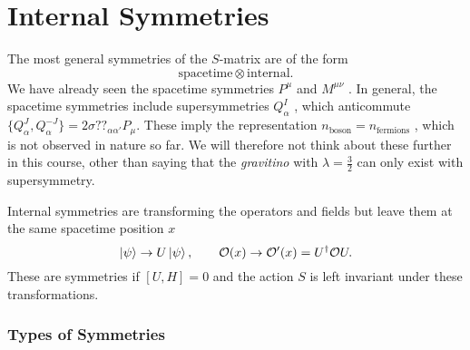 
\chapter{Internal Symmetries}%
\label{cha:internal_symmetries}

The most general symmetries of the $S$-matrix are of the form
\begin{equation}
  \text{spacetime} \otimes \text{internal}.
\end{equation}
We have already seen the spacetime symmetries $P^{\mu}$ and $M^{\mu\nu}$ .
In general, the spacetime symmetries include supersymmetries $Q_{\alpha}^I$ , which anticommute $\{Q_{\alpha}^J, Q_{\alpha}^{-J}\} = 2 \sigma ??_{\alpha \alpha'} P_{\mu}$.
These imply the representation $n_{\text{boson}} = n_{\text{fermions}}$ , which is not observed in nature so far.
We will therefore not think about these further in this course, other than saying that the \emph{gravitino} with $\lambda = \frac{3}{2}$  can only exist with supersymmetry.

Internal symmetries are transforming the operators and fields but leave them at the same spacetime position $x$
\begin{equation}
  \ket{\psi} \to U \ket{\psi}, \qquad \mathcal{O}(x) \to \mathcal{O}'(x) = U^{\dagger} \mathcal{O} U.
\end{equation}
These are symmetries if $[U, H] = 0$ and the action $S$  is left invariant under these transformations.

\subsection{Types of Symmetries}%
\label{sub:types_of_symmetries}


